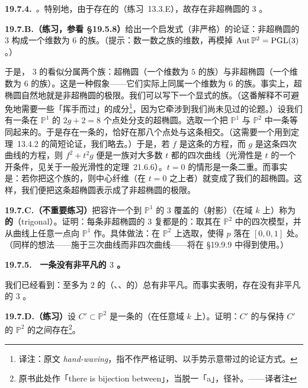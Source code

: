 \textbf{19.7.4.}\ \emph{\trhRemark{}。}\quad 特别地，由于存在\trRegular{}的\trPlaneQuartic（\mbox{练习~13.3.E}），故存在非超椭圆的\trGenus{} $3$ \trCurve。

\textbf{19.7.B.（练习，参看 \S19.5.8）}\quad 给出一个启发式（非严格）的论证：非超椭圆的\trGenus{} $3$ \trCurve{}构成一个维数为 $6$ 的族。（提示：数一数\trRegular{}\trPlaneQuartic{}之族的维数，再模掉 $\operatorname{Aut}\mathbb{P}^2=\mathrm{PGL}(3)$。）

于是，\trGenus{} $3$ 的\trCurve{}看似分属两个族：超椭圆\trCurve{}（一个维数为 $5$ 的族）与非超椭圆\trCurve{}（一个维数为 $6$ 的族）。这是一种假象——它们实际上同属一个维数为 $6$ 的族。事实上，超椭圆\trCurve{}自然地就是非超椭圆\trCurve{}的极限。我们可以写下一个显式的族。（这番解释不可避免地需要一些「挥手而过」的成分\footnote{译注：原文 \emph{hand-waving}，指不作严格证明、以手势示意带过的论证方式。}，因为它牵涉到我们尚未见过的论题。）设我们有一条在 $\mathbb{P}^1$ 的 $2g+2=8$ 个点处分支的超椭圆\trCurve。选取一个把 $\mathbb{P}^1$ 与 $\mathbb{P}^2$ 中一条\trConic{}等同起来的\trIsomorphism。于是存在一条\trRegular{}的\trPlaneQuartic，恰好在那八个点处与这条\trConic{}相交。（这需要一个用到\trBertini{}定理~\mbox{13.4.2} 的简短论证，我们略去。）于是，若 $f$ 是这条\trConic{}的方程，而 $g$ 是这条四次曲线的方程，则 $f^2+t^2g$ 便是一族对大多数 $t$ 都\trSmooth{}的四次曲线（光滑性是 $t$ 的一个开条件，见关于一般光滑性的\mbox{定理~21.6.6}）。$t=0$ 的情形是一条二重\trConic。而事实是：若你把这个族的\trTotalSpace{}\trNormalization，则中心纤维（在 $t=0$ 之上者）就变成了我们的超椭圆\trCurve。这样，我们便把这条超椭圆\trCurve{}表示成了非超椭圆\trCurve{}的极限。

\textbf{19.7.C.（不重要练习）}\quad 把容许一个到 $\mathbb{P}^1$ 的\trDegree{} $3$ 覆盖的（射影）\trCurve{}（在域 $k$ 上）称为\textbf{\trTrigonal{}的}（trigonal）。证明：每条非超椭圆的\trGenus{} $3$ 复\trCurve{}都是\trTrigonal{}的：取其在 $\mathbb{P}^2$ 中的四次模型，并从曲线上任意一点向 $\mathbb{P}^1$ 作\trProjection。具体做法：在 $\mathbb{P}^2$ 上选取\trCoordinate{}，使得 $p$ 落在 $[0,0,1]$ 处。（同样的想法——施于三次曲线而非四次曲线——将在 \S19.9.9 中得到使用。）

\textbf{19.7.5.}\ \hard\ \textbf{一条没有非平凡\trAutomorphism{}的\trGenus{} $3$ \trCurve。}

我们已经看到：\trGenus{}至多为 $2$ 的（\trSmooth、\trProjective、\trIntegral{}的）\trCurve{}总有非平凡\trAutomorphism。而事实表明，存在没有非平凡\trAutomorphism{}的\trGenus{} $3$ \trCurve。

\textbf{19.7.D.（练习）}\quad 设 $C'\subset\mathbb{P}^2$ 是一条\trSmooth{}的\trPlaneQuartic{}（在任意域 $k$ 上）。证明：$C'$ 的\trAutomorphism{}与保持 $C'$ 的 $\mathbb{P}^2$ 的\trAutomorphism{}之间存在\trBijection\footnote{原书此处作「there is bijection between」，当脱一「a」，径补。——译者注}。


